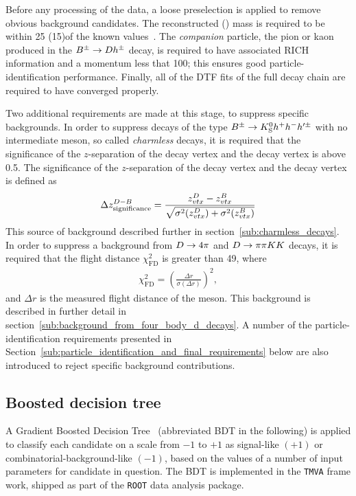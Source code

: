 Before any processing of the data, a loose preselection is applied to remove obvious background candidates. The reconstructed \D (\KS) mass is required to be within 25 (15)\mevcc of the known values~\cite{PDG20}. The \emph{companion} particle, the pion or kaon produced in the ${{B}^\pm}\rightarrow{\ensuremath{D}} h^\pm$ decay, is required to have associated RICH information and a momentum less that 100\gevc; this ensures good particle-identification performance. Finally, all of the DTF fits of the full decay chain are required to have converged properly.

Two additional requirements are made at this stage, to suppress specific backgrounds.
In order to suppress decays of the type ${{B}^\pm} \rightarrow {\ensuremath{{K}^0_{\mathrm{S}}}} h^+h^- h'^\pm$ with no intermediate \D meson, so called \emph{charmless} decays, it is required that the significance of the $z$-separation of the \Dz decay vertex and the \Bpm decay vertex is above 0.5. The significance of the $z$-separation of the \Dz decay vertex and the \Bpm decay vertex is defined as
\begin{align}
    \Delta z^{D-B}_{\text{significance}}=\frac{z_{vtx}^{D}-z_{vtx}^{B}}{\sqrt{\sigma^2(z_{vtx}^{D})+\sigma^2(z_{vtx}^{B})}}
\end{align} This source of background described further in section~\ref{sub:charmless_decays}. In order to suppress a background from ${D}\rightarrow4\pi$ and ${D}\rightarrow\pi\pi{\ensuremath{K}}{\ensuremath{K}}$ decays,  it is required that the \KS flight distance $\chi^2_\text{FD}$ is greater than 49, where
\begin{align}
    \chi^2_\text{FD} = \left(\frac{\Delta r}{\sigma(\Delta r)}\right)^2,
\end{align} and $\Delta r$ is the measured flight distance of the \KS meson. This background is described in further detail in section~\ref{sub:background_from_four_body_d_decays}. A number of the particle-identification requirements presented in Section~\ref{sub:particle_identification_and_final_requirements} below are also introduced to reject specific background contributions.




\subsection{Boosted decision tree} %
\label{sub:boosted_decision_tree}

A Gradient Boosted Decision Tree~\cite{} (abbreviated BDT in the following) is applied to classify each candidate on a scale from $-1$ to $+1$ as signal-like $(+1)$ or combinatorial-background-like $(-1)$, based on the values of a number of input parameters for candidate in question. The BDT is implemented in the \texttt{TMVA} frame work, shipped as part of the \texttt{ROOT} data analysis package. 

